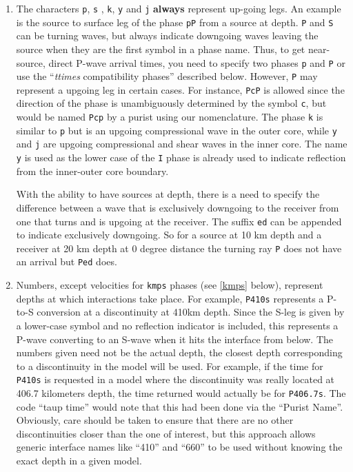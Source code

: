 \begin{enumerate}
\item \label{Ped} The characters \texttt{p}, \texttt{s}
, \texttt{k}, \texttt{y} and \texttt{j} \textbf{always} represent
up-going legs.
An example is the source to surface leg of the phase \texttt{pP}
from a source at depth.
\texttt{P} and \texttt{S} can be turning waves, but
always indicate downgoing waves leaving the source when they are the first symbol in a
phase name.
Thus, to get near-source, direct P-wave arrival times, you need to specify two
phases \texttt{p} and \texttt{P} or use the ``\textit{ttimes} compatibility phases'' described
below.
However, \texttt{P} may
represent a upgoing leg in certain cases.
For instance, \texttt{PcP} is
allowed since the direction of the phase is unambiguously determined by the symbol
\texttt{c}, but would be named \texttt{Pcp} by a purist using our nomenclature. The phase
\texttt{k} is similar to \texttt{p} but is an upgoing compressional wave in the outer core, while \texttt{y}
and \texttt{j} are upgoing compressional and shear waves
in the inner core. The name \texttt{y} is used as the
lower case of the \texttt{I} phase is already used to indicate
reflection from the inner-outer core boundary.

With the ability to have sources at depth, there is a need to specify the difference between a wave that is
exclusively downgoing to the receiver from one that turns and is upgoing at the receiver. The suffix \texttt{ed}
can be appended to indicate exclusively downgoing. So for a source at 10 km depth and a receiver at 20 km depth
at 0 degree distance the turning ray \texttt{P} does not have an arrival but \texttt{Ped} does.

\item Numbers, except velocities for \texttt{kmps}
phases (see \ref{kmps} below),
represent depths at which interactions take place.
For example, \texttt{P410s} represents a P-to-S conversion at a discontinuity at 410km
depth.
Since the S-leg is given by a lower-case symbol and no reflection indicator is
included, this represents a P-wave  converting to an S-wave when it hits the interface
from below.
The numbers given need not be the actual depth, the closest depth corresponding to a
discontinuity in the model will be used.
For example, if the time for \texttt{P410s} is requested in a model where the discontinuity
was really located at 406.7 kilometers depth, the time returned would actually be for
\texttt{P406.7s}.
The code ``taup time'' would note that this had been done via the ``Purist Name''.
Obviously, care should be taken to ensure that there are no other discontinuities
closer than the one of interest, but this approach allows generic interface
names like ``410'' and ``660'' to be used without knowing the exact depth in a given
model.


\end{enumerate}

